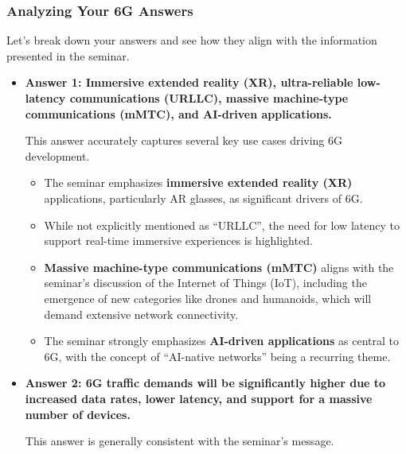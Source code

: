 \documentclass[
]{article}
\author{}
\date{}
\begin{document}
\subsubsection{Analyzing Your 6G
Answers}\label{analyzing-your-6g-answers}

Let's break down your answers and see how they align with the
information presented in the seminar.

\begin{itemize}
\item
  \textbf{Answer 1: Immersive extended reality (XR), ultra-reliable
  low-latency communications (URLLC), massive machine-type
  communications (mMTC), and AI-driven applications.}

  This answer accurately captures several key use cases driving 6G
  development.

  \begin{itemize}
  
  \item
    The seminar emphasizes \textbf{immersive extended reality (XR)}
    applications, particularly AR glasses, as significant drivers of 6G.
  \item
    While not explicitly mentioned as ``URLLC'', the need for low
    latency to support real-time immersive experiences is highlighted.
  \item
    \textbf{Massive machine-type communications (mMTC)} aligns with the
    seminar's discussion of the Internet of Things (IoT), including the
    emergence of new categories like drones and humanoids, which will
    demand extensive network connectivity.
  \item
    The seminar strongly emphasizes \textbf{AI-driven applications} as
    central to 6G, with the concept of ``AI-native networks'' being a
    recurring theme.
  \end{itemize}
\item
  \textbf{Answer 2: 6G traffic demands will be significantly higher due
  to increased data rates, lower latency, and support for a massive
  number of devices.}

  This answer is generally consistent with the seminar's message.

  \begin{itemize}
  

\end{itemize}
\end{itemize}
\end{document}

